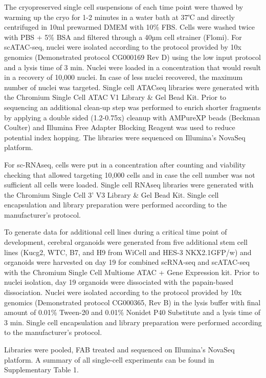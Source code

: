The cryopreserved single cell suspensions of each time point were thawed by warming up the cryo for 1-2 minutes in a water bath at 37℃ and directly centrifuged in 10ml prewarmed DMEM with 10\% FBS. Cells were washed twice with PBS + 5\% BSA and filtered through a 40µm cell strainer (Flomi). For scATAC-seq, nuclei were isolated according to the protocol provided by 10x genomics (Demonstrated protocol CG000169 Rev D) using the low input protocol and a lysis time of 3 min. Nuclei were loaded in a concentration that would result in a recovery of 10,000 nuclei. In case of less nuclei recovered, the maximum number of nuclei was targeted. Single cell ATACseq libraries were generated with the Chromium Single Cell ATAC V1 Library \& Gel Bead Kit. Prior to sequencing an additional clean-up step was performed to enrich shorter fragments by applying a double sided (1.2-0.75x) cleanup with AMPureXP beads (Beckman Coulter) and Illumina Free Adapter Blocking Reagent was used to reduce potential index hopping. The libraries were sequenced on Illumina’s NovaSeq platform.

For sc-RNAseq, cells were put in a concentration after counting and viability checking that allowed targeting 10,000 cells and in case the cell number was not sufficient all cells were loaded. Single cell RNAseq libraries were generated with the Chromium Single Cell 3’ V3 Library \& Gel Bead Kit. Single cell encapsulation and library preparation were performed according to the manufacturer's protocol.

To generate data for additional cell lines during a critical time point of development, cerebral organoids were generated from five additional stem cell lines (Kucg2, WTC, B7, and H9 from WiCell and HES-3 NKX2.1GFP/w) and organoids were harvested on day 19 for combined scRNA-seq and scATAC-seq with the Chromium Single Cell Multiome ATAC + Gene Expression kit. Prior to nuclei isolation, day 19 organoids were dissociated with the papain-based dissociation. Nuclei were isolated according to the protocol provided by 10x genomics (Demonstrated protocol CG000365, Rev B) in the lysis buffer with final amount of 0.01\% Tween-20 and 0.01\% Nonidet P40 Substitute and a lysis time of 3 min. Single cell encapsulation and library preparation were performed according to the manufacturer's protocol.

Libraries were pooled, FAB treated and sequenced on Illumina’s NovaSeq platform. A summary of all single-cell experiments can be found in Supplementary Table 1. 
 
